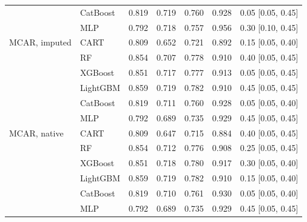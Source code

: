 \documentclass[pdflatex,sn-mathphys]{sn-jnl}
\theoremstyle{thmstyleone}
\begin{document}
\begin{table}[htbp]
\begin{tabular}{@{}llrrrrl@{}}
 & CatBoost & 0.819 & 0.719 & 0.760 & 0.928 & 0.05 [0.05, 0.45] \\
 & MLP & 0.792 & 0.718 & 0.757 & 0.956 & 0.30 [0.10, 0.45] \\
\midrule
MCAR, imputed & CART & 0.809 & 0.652 & 0.721 & 0.892 & 0.15 [0.05, 0.40] \\
 & RF & 0.854 & 0.707 & 0.778 & 0.910 & 0.40 [0.05, 0.45] \\
 & XGBoost & 0.851 & 0.717 & 0.777 & 0.913 & 0.05 [0.05, 0.45] \\
 & LightGBM & 0.859 & 0.719 & 0.782 & 0.910 & 0.45 [0.05, 0.45] \\
 & CatBoost & 0.819 & 0.711 & 0.760 & 0.928 & 0.05 [0.05, 0.40] \\
 & MLP & 0.792 & 0.689 & 0.735 & 0.929 & 0.45 [0.05, 0.45] \\
\midrule
MCAR, native & CART & 0.809 & 0.647 & 0.715 & 0.884 & 0.40 [0.05, 0.45] \\
 & RF & 0.854 & 0.712 & 0.776 & 0.908 & 0.25 [0.05, 0.45] \\
 & XGBoost & 0.851 & 0.718 & 0.780 & 0.917 & 0.30 [0.05, 0.40] \\
 & LightGBM & 0.859 & 0.719 & 0.782 & 0.910 & 0.15 [0.05, 0.40] \\
 & CatBoost & 0.819 & 0.710 & 0.761 & 0.930 & 0.05 [0.05, 0.40] \\
 & MLP & 0.792 & 0.689 & 0.735 & 0.929 & 0.45 [0.05, 0.45] \\
\bottomrule
\end{tabular}
\end{table}
\end{document}
